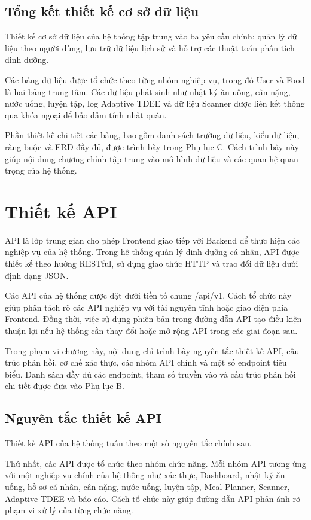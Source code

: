\documentclass[12pt, a4paper]{report}
\begin{document}
\subsection{Tổng kết thiết kế cơ sở dữ liệu}Thiết kế cơ sở dữ liệu của hệ thống tập trung vào ba yêu cầu chính: quản lý dữ liệu theo người dùng, lưu trữ dữ liệu lịch sử và hỗ trợ các thuật toán phân tích dinh dưỡng.

Các bảng dữ liệu được tổ chức theo từng nhóm nghiệp vụ, trong đó User và Food là hai bảng trung tâm. Các dữ liệu phát sinh như nhật ký ăn uống, cân nặng, nước uống, luyện tập, log Adaptive TDEE và dữ liệu Scanner được liên kết thông qua khóa ngoại để bảo đảm tính nhất quán.

Phần thiết kế chi tiết các bảng, bao gồm danh sách trường dữ liệu, kiểu dữ liệu, ràng buộc và ERD đầy đủ, được trình bày trong Phụ lục C. Cách trình bày này giúp nội dung chương chính tập trung vào mô hình dữ liệu và các quan hệ quan trọng của hệ thống.

\section{Thiết kế API}API là lớp trung gian cho phép Frontend giao tiếp với Backend để thực hiện các nghiệp vụ của hệ thống. Trong hệ thống quản lý dinh dưỡng cá nhân, API được thiết kế theo hướng RESTful, sử dụng giao thức HTTP và trao đổi dữ liệu dưới định dạng JSON.

Các API của hệ thống được đặt dưới tiền tố chung /api/v1. Cách tổ chức này giúp phân tách rõ các API nghiệp vụ với tài nguyên tĩnh hoặc giao diện phía Frontend. Đồng thời, việc sử dụng phiên bản trong đường dẫn API tạo điều kiện thuận lợi nếu hệ thống cần thay đổi hoặc mở rộng API trong các giai đoạn sau.

Trong phạm vi chương này, nội dung chỉ trình bày nguyên tắc thiết kế API, cấu trúc phản hồi, cơ chế xác thực, các nhóm API chính và một số endpoint tiêu biểu. Danh sách đầy đủ các endpoint, tham số truyền vào và cấu trúc phản hồi chi tiết được đưa vào Phụ lục B.

\subsection{Nguyên tắc thiết kế API}Thiết kế API của hệ thống tuân theo một số nguyên tắc chính sau.

Thứ nhất, các API được tổ chức theo nhóm chức năng. Mỗi nhóm API tương ứng với một nghiệp vụ chính của hệ thống như xác thực, Dashboard, nhật ký ăn uống, hồ sơ cá nhân, cân nặng, nước uống, luyện tập, Meal Planner, Scanner, Adaptive TDEE và báo cáo. Cách tổ chức này giúp đường dẫn API phản ánh rõ phạm vi xử lý của từng chức năng.
\end{document}
